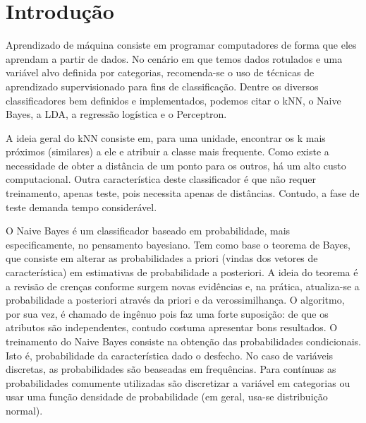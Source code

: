 \documentclass[
	12pt,				%
	openright,			%
	twoside,			%
	a4paper,			%
	english,			%
	brazil,				%
	svgnames
	]{abntex2}\usepackage[]{graphicx}\usepackage[]{color}
\begin{document}

\tableofcontents*
\cleardoublepage

\textual

\chapter{Introdução}
\label{cap:introducao}


Aprendizado de máquina consiste em programar computadores de forma que eles aprendam a partir de dados. No cenário em que temos dados rotulados e uma variável alvo definida por categorias, recomenda-se o uso de técnicas de aprendizado supervisionado para fins de classificação. Dentre os diversos classificadores bem definidos e implementados, podemos citar o kNN, o Naive Bayes, a LDA, a regressão logística e o Perceptron.

A ideia geral do kNN consiste em, para uma unidade, encontrar os k mais próximos (similares) a ele e atribuir a classe mais frequente. Como existe a necessidade de obter a distância de um ponto para os outros, há um alto custo computacional. Outra característica deste classificador é que não requer treinamento, apenas teste, pois necessita apenas de distâncias. Contudo, a fase de teste demanda tempo considerável.

O Naive Bayes é um classificador baseado em probabilidade, mais especificamente, no pensamento bayesiano. Tem como base o teorema de Bayes, que consiste em alterar as probabilidades a priori (vindas dos vetores de característica) em estimativas de probabilidade a posteriori. A ideia do teorema é a revisão de crenças conforme surgem novas evidências e, na prática, atualiza-se a probabilidade a posteriori através da priori e da verossimilhança. O algoritmo, por sua vez, é chamado de ingênuo pois faz uma forte suposição: de que os atributos são independentes, contudo costuma apresentar bons resultados. O treinamento do Naive Bayes consiste na obtenção das probabilidades condicionais. Isto é, probabilidade da característica dado o desfecho. No caso de variáveis discretas, as probabilidades são beaseadas em frequências. Para contínuas as probabilidades comumente utilizadas são discretizar a variável em categorias ou usar uma função densidade de probabilidade (em geral, usa-se distribuição normal).
\end{document}
